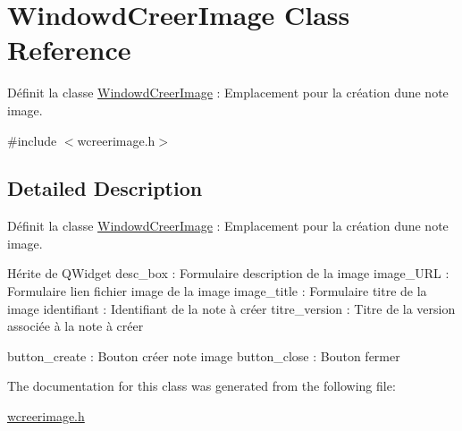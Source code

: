 \hypertarget{class_windowd_creer_image}{}\section{Windowd\+Creer\+Image Class Reference}
\label{class_windowd_creer_image}


Définit la classe \hyperlink{class_windowd_creer_image}{Windowd\+Creer\+Image} \+: Emplacement pour la création d\textquotesingle{}une note image.  




{\ttfamily \#include $<$wcreerimage.\+h$>$}



\subsection{Detailed Description}
Définit la classe \hyperlink{class_windowd_creer_image}{Windowd\+Creer\+Image} \+: Emplacement pour la création d\textquotesingle{}une note image. 

Hérite de Q\+Widget desc\+\_\+box \+: Formulaire description de la image image\+\_\+\+U\+RL \+: Formulaire lien fichier image de la image image\+\_\+title \+: Formulaire titre de la image identifiant \+: Identifiant de la note à créer titre\+\_\+version \+: Titre de la version associée à la note à créer

button\+\_\+create \+: Bouton créer note image button\+\_\+close \+: Bouton fermer 

The documentation for this class was generated from the following file\+:\begin{DoxyCompactItemize}
\item 
\hyperlink{wcreerimage_8h}{wcreerimage.\+h}\end{DoxyCompactItemize}
